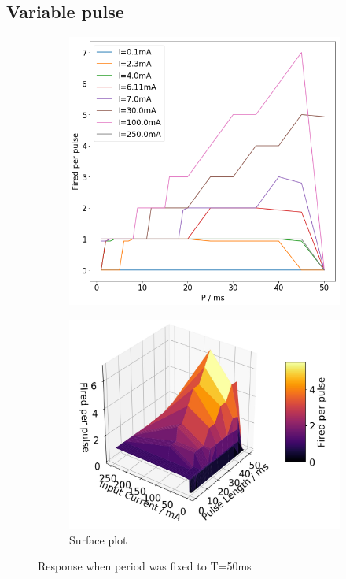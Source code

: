 \documentclass[twoside,twocolumn]{article}
\begin{document}
\subsection{ Variable pulse}

\begin{figure}[h]
  \centering
  \begin{subfigure}[t]{0.5\textwidth}
    \includegraphics[width=\linewidth]{pf}
  \caption{}
  \label{sub:2cf}
  \end{subfigure}
  \begin{subfigure}[t]{0.5\textwidth}
    \includegraphics[width=\linewidth]{p3d}
  \caption{Surface plot}
  \label{sub:2c3d}
  \end{subfigure}
  \caption{Response when period was fixed to T=50ms}
  \label{fig:2c}
\end{figure}
\end{document}
